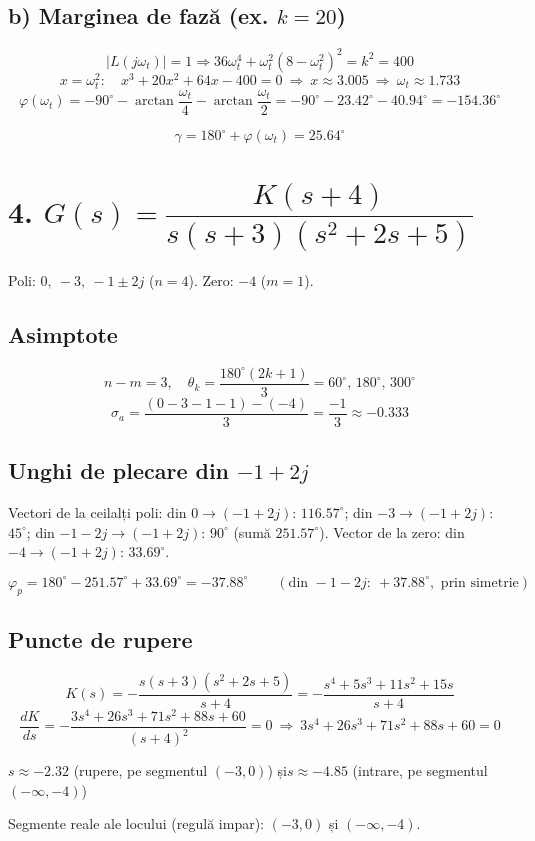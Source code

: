\documentclass[10pt,a4paper]{article}
\begin{document}
\subsection*{b) Marginea de fază (ex. $k=20$)}
$$|L(j\omega_t)|=1\Rightarrow 36\omega_t^4+\omega_t^2(8-\omega_t^2)^2=k^2=400$$
$$x=\omega_t^2:\quad x^3+20x^2+64x-400=0\ \Rightarrow\ x\approx3.005\ \Rightarrow\ \omega_t\approx1.733$$
$$\varphi(\omega_t)=-90^\circ-\arctan\frac{\omega_t}{4}-\arctan\frac{\omega_t}{2}=-90^\circ-23.42^\circ-40.94^\circ=-154.36^\circ$$
\begin{res}
$$\gamma=180^\circ+\varphi(\omega_t)=25.64^\circ$$
\end{res}

\section*{4. $G(s)=\dfrac{K(s+4)}{s(s+3)(s^2+2s+5)}$}
Poli: $0,\ -3,\ -1{\pm}2j$ ($n=4$). Zero: $-4$ ($m=1$).

\subsection*{Asimptote}
\begin{res}
$$n-m=3,\quad \theta_k=\frac{180^\circ(2k+1)}{3}=60^\circ,\,180^\circ,\,300^\circ$$
$$\sigma_a=\frac{(0-3-1-1)-(-4)}{3}=\frac{-1}{3}\approx-0.333$$
\end{res}

\subsection*{Unghi de plecare din $-1+2j$}
Vectori de la ceilalți poli: din $0\to(-1{+}2j)$: $116.57^\circ$; din $-3\to(-1{+}2j)$: $45^\circ$; din $-1{-}2j\to(-1{+}2j)$: $90^\circ$ (sumă $251.57^\circ$).
Vector de la zero: din $-4\to(-1{+}2j)$: $33.69^\circ$.
\begin{res}
$$\varphi_p=180^\circ-251.57^\circ+33.69^\circ=-37.88^\circ \qquad(\text{din }-1{-}2j:\ +37.88^\circ,\text{ prin simetrie})$$
\end{res}

\subsection*{Puncte de rupere}
$$K(s)=-\frac{s(s+3)(s^2+2s+5)}{s+4}=-\frac{s^4+5s^3+11s^2+15s}{s+4}$$
$$\frac{dK}{ds}=-\frac{3s^4+26s^3+71s^2+88s+60}{(s+4)^2}=0\ \Rightarrow\ 3s^4+26s^3+71s^2+88s+60=0$$
\begin{res}
$s\approx-2.32$ (rupere, pe segmentul $(-3,0)$) \quad și\quad $s\approx-4.85$ (intrare, pe segmentul $(-\infty,-4)$)
\end{res}
Segmente reale ale locului (regulă impar): $(-3,0)$ și $(-\infty,-4)$.
\end{document}
